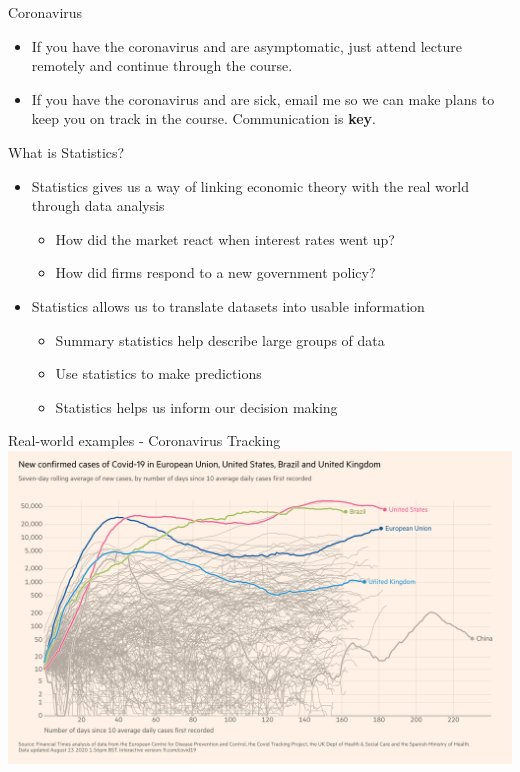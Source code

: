 \documentclass{beamer}
\begin{document}
\begin{frame}{Coronavirus}
    \begin{itemize}
        \item If you have the coronavirus and are asymptomatic, just attend lecture remotely and continue through the course.
        \item If you have the coronavirus and are sick, email me so we can make plans to keep you on track in the course. Communication is \textbf{key}.
    \end{itemize}
\end{frame}


\begin{frame}{What is Statistics?}
	
	\begin{itemize}
		\item Statistics gives us a way of linking economic theory with the real world through data analysis
		      \begin{itemize}
		      	\item How did the market react when interest rates went up? 
		      	\item How did firms respond to a new government policy?
		      \end{itemize}

		\item Statistics allows us to translate datasets into usable information
		      \begin{itemize}
		      	\item Summary statistics help describe large groups of data
		      	\item Use statistics to make predictions
		      	\item Statistics helps us inform our decision making
		      \end{itemize}
	\end{itemize}
	
\end{frame}


\begin{frame}{Real-world examples - Coronavirus Tracking}
    \includegraphics[width=\linewidth]{coronavirus.png}
\end{frame}
\end{document}
